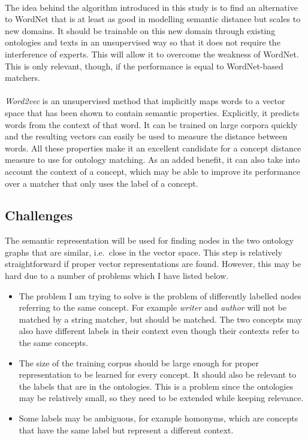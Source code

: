 \documentclass{article}
\begin{document}
 \paragraph{}
 The idea behind the algorithm introduced in this study is to find an alternative to WordNet that is at least as good in modelling semantic distance but scales to new domains. It should be trainable on this new domain through existing ontologies and texts in an unsupervised way so that it does not require the interference of experts. This will allow it to overcome the weakness of WordNet. This is only relevant, though, if the performance is equal to WordNet-based matchers.
 \paragraph{}
 \emph{Word2vec} is an unsupervised method that implicitly maps words to a vector space that has been shown to contain semantic properties. Explicitly, it predicts words from the context of that word\cite{w2v}.
 It can be trained on large corpora quickly and the resulting vectors can easily be used to measure the distance between words. All these properties make it an excellent candidate for a concept distance measure to use for ontology matching. As an added benefit, it can also take into account the context of a concept, which may be able to improve its performance over a matcher that only uses the label of a concept. 
 
 \subsection{Challenges}
 The semantic representation will be used for finding nodes in the two ontology graphs that are similar, i.e.\ close in the vector space. This step is relatively straightforward if proper vector representations are found. However, this may be hard due to a number of problems which I have listed below.

 \begin{itemize}
  \item The problem I am trying to solve is the problem of differently labelled nodes referring to the same concept. For example \emph{writer} and \emph{author} will not be matched by a string matcher, but should be matched. The two concepts may also have different labels in their context even though their contexts refer to the same concepts.
  \item The size of the training corpus should be large enough for proper representation to be learned for every concept. It should also be relevant to the labels that are in the ontologies. This is a problem since the ontologies may be relatively small, so they need to be extended while keeping relevance.
  \item Some labels may be ambiguous, for example homonyms, which are concepts that have the same label but represent a different context.
 \end{itemize}
 
\end{document}
